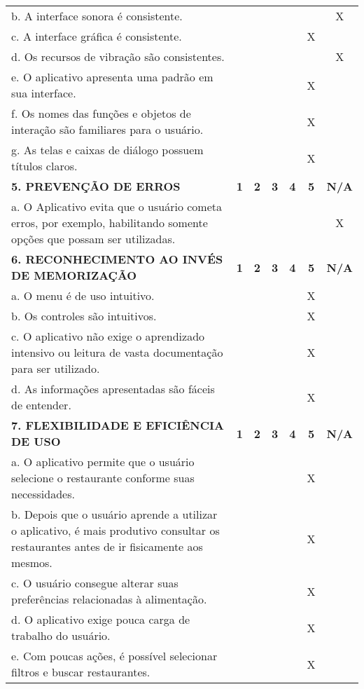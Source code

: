 \documentclass[portuguese,oneside]{tcc}
\begin{document}
\begin{center}
\begin{longtabu}{|L{25em}|c|c|c|c|c|c|}
	b. A interface sonora é consistente. & & & & & & X \\ 
	c. A interface gráfica é consistente. & & & & & X & \\ 
	d. Os recursos de vibração são consistentes. & & & & & & X \\ 
	e. O aplicativo apresenta uma padrão em sua interface. & & & & & X & \\ 
	f. Os nomes das funções e objetos de interação são familiares para o usuário. & & & & & X & \\ 
	g. As telas e caixas de diálogo possuem títulos claros. & & & & & X & \\ 
	\textbf{5. PREVENÇÃO DE ERROS} & \textbf{1} & \textbf{2} & \textbf{3} & \textbf{4} & \textbf{5} & \textbf{N/A} \\ 
	a. O Aplicativo evita que o usuário cometa erros, por exemplo, habilitando somente opções que possam ser utilizadas. & & & & & & X \\ 
	\textbf{6. RECONHECIMENTO AO INVÉS DE MEMORIZAÇÃO} & \textbf{1} & \textbf{2} & \textbf{3} & \textbf{4} & \textbf{5} & \textbf{N/A} \\ 
	a. O  menu é de uso intuitivo. & & & & & X & \\ 
	b. Os controles são intuitivos. & & & & & X & \\ 
	c. O aplicativo não exige o aprendizado intensivo ou leitura de vasta documentação para ser utilizado. & & & & & X & \\ 
	d. As informações apresentadas são fáceis de entender. & & & & & X & \\ 
	\textbf{7. FLEXIBILIDADE E EFICIÊNCIA DE USO} & \textbf{1} & \textbf{2} & \textbf{3} & \textbf{4} & \textbf{5} & \textbf{N/A} \\ 
	a. O aplicativo permite que o usuário selecione o restaurante conforme suas necessidades. & & & & & X & \\ 
	b. Depois que o usuário aprende a utilizar o aplicativo, é mais produtivo consultar os restaurantes antes de ir fisicamente aos mesmos. & & & & & X & \\ 
	c. O usuário consegue alterar suas preferências relacionadas à alimentação. & & & & & X & \\ 
	d. O aplicativo exige pouca carga de trabalho do usuário. & & & & & X & \\ 
	e. Com poucas ações, é possível selecionar filtros e buscar restaurantes. & & & & & X & \\ 

\end{longtabu}
\end{center}
\end{document}
